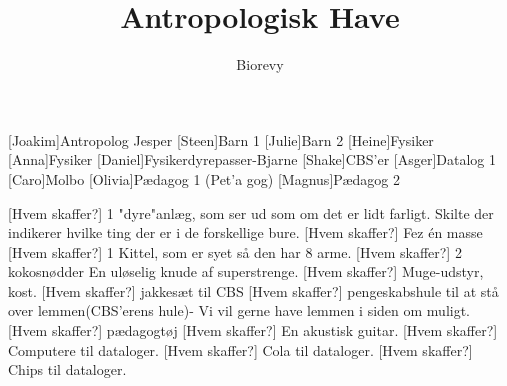 \documentclass[a4paper,12pt]{article}
\title{Antropologisk Have}
\author{Biorevy}
\begin{document}
\maketitle




\begin{roles}
	[Joakim]Antropolog Jesper
	[Steen]Barn 1
	[Julie]Barn 2
	[Heine]Fysiker
	[Anna]Fysiker
	[Daniel]Fysikerdyrepasser-Bjarne
	[Shake]CBS'er
	[Asger]Datalog 1
	[Caro]Molbo
	[Olivia]Pædagog 1 (Pet'a gog)
	[Magnus]Pædagog 2
\end{roles}


\begin{props}
	[Hvem skaffer?] 1 "dyre"anlæg, som ser ud som om det er lidt farligt. 
	 Skilte der indikerer hvilke ting der er i de forskellige bure.
	[Hvem skaffer?] Fez én masse
	[Hvem skaffer?] 1 Kittel, som er syet så den har 8 arme.
	[Hvem skaffer?] 2 kokosnødder
	 En uløselig knude af superstrenge.
	[Hvem skaffer?] Muge-udstyr, kost.
	[Hvem skaffer?] jakkesæt til CBS
	[Hvem skaffer?] pengeskabshule til at stå over lemmen(CBS'erens hule)- Vi vil gerne have lemmen i siden om muligt.
	[Hvem skaffer?] pædagogtøj
	[Hvem skaffer?] En akustisk guitar.
	[Hvem skaffer?] Computere til dataloger.
	[Hvem skaffer?] Cola til dataloger.
	[Hvem skaffer?] Chips til dataloger.
\end{props}
\end{document}
